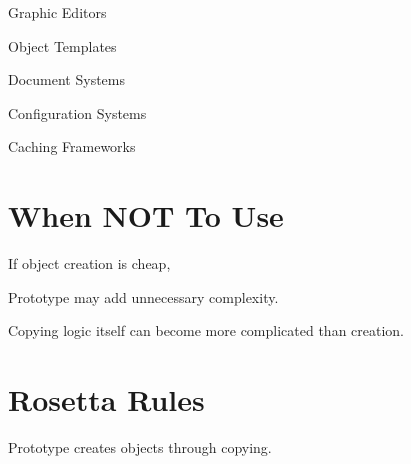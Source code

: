 \documentclass[11pt,a4paper]{book}
\begin{document}

Graphic Editors


Object Templates


Document Systems


Configuration Systems


Caching Frameworks


\section{When NOT To Use}

\begin{trap}

If object creation is cheap,

Prototype may add unnecessary
complexity.


Copying logic itself can become
more complicated than creation.

\end{trap}


\section{Rosetta Rules}

\begin{rosettarule}

Prototype creates objects
through copying.

\end{rosettarule}

\end{document}
